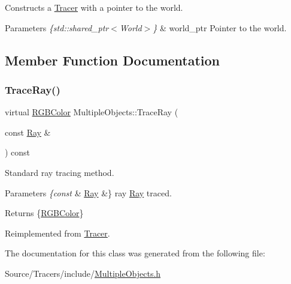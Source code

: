 Constructs a \hyperlink{class_tracer}{Tracer} with a pointer to the world. 
\begin{DoxyParams}{Parameters}
{\em \{std\+::shared\+\_\+ptr$<$\+World$>$\}} & world\+\_\+ptr Pointer to the world. \\
\hline
\end{DoxyParams}


\subsection{Member Function Documentation}
\hypertarget{class_multiple_objects_a46206cc6dd09a9c587e33ac896bc8e3a}{}\label{class_multiple_objects_a46206cc6dd09a9c587e33ac896bc8e3a} 
\subsubsection{\texorpdfstring{Trace\+Ray()}{TraceRay()}}
{\footnotesize\ttfamily virtual \hyperlink{class_r_g_b_color}{R\+G\+B\+Color} Multiple\+Objects\+::\+Trace\+Ray (\begin{DoxyParamCaption}\item[{const \hyperlink{class_ray}{Ray} \&}]{ }\end{DoxyParamCaption}) const\hspace{0.3cm}{\ttfamily [virtual]}}

Standard ray tracing method. 
\begin{DoxyParams}{Parameters}
{\em \{const} & \hyperlink{class_ray}{Ray} \&\} ray \hyperlink{class_ray}{Ray} traced. \\
\hline
\end{DoxyParams}
\begin{DoxyReturn}{Returns}
\{\hyperlink{class_r_g_b_color}{R\+G\+B\+Color}\} 
\end{DoxyReturn}


Reimplemented from \hyperlink{class_tracer_adbabdfde11e278945a0433d08445fcce}{Tracer}.



The documentation for this class was generated from the following file\+:\begin{DoxyCompactItemize}
\item 
Source/\+Tracers/include/\hyperlink{_multiple_objects_8h}{Multiple\+Objects.\+h}\end{DoxyCompactItemize}
